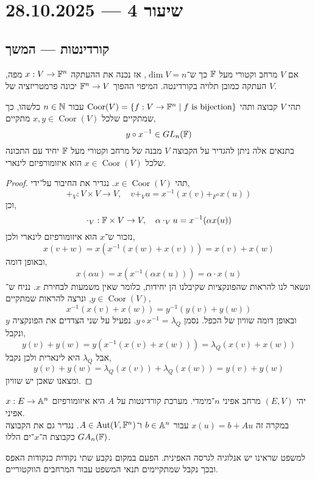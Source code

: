 \section{שיעור 4 --- 28.10.2025}
\subsection{קורדינטות --- המשך}
\begin{definition}
	אם $V$ מרחב וקטורי מעל $\mathbb{F}$ כך ש־$\dim V = n$, אז נכנה את ההעתקה $x : V \to \mathbb{F}^n$ מפה, העתקה כמובן תלויה בקורדינטה.
	המיפוי ההפוך $\mathbb{F}^n \to V$ יכונה פרמטריזציה של $V$.
\end{definition}
\begin{theorem}
	תהי $V$ קבוצה ותהי $\operatorname{Coor}(V) = \{ f : V \to \mathbb{F}^n \mid f \text{ is bijection} \}$ עבור $n \in \mathbb{N}$ כלשהו,
	כך שמתקיים שלכל $x, y \in \operatorname{Coor}(V)$ מתקיים,
	\[
		y \circ x^{-1} \in GL_n(\mathbb{F})
	\]
	בתנאים אלה ניתן להגדיר על הקבוצה $V$ מבנה של מרחב וקטורי מעל $\mathbb{F}$ יחיד עם התכונה שלכל $x \in \operatorname{Coor}(V)$ הוא איזומורפיזם לינארי.
\end{theorem}
\begin{proof}
	תהי $x \in \operatorname{Coor}(V)$.
	נגדיר את החיבור על־ידי,
	\[
		+_V : V \times V \to V,
		\quad
		v +_V u = x^{-1}(x(v) +_{F^n} x(u))
	\]
	וכן,
	\[
		\cdot_V : \mathbb{F} \times V \to V,
		\quad
		\alpha \cdot_V u = x^{-1}(\alpha x(u))
	\]
	נזכור ש־$x$ הוא איזומורפיזם לינארי ולכן,
	\[
		x(v + w)
		= x(x^{-1}(x(w) + x(v)))
		= x(v) + x(w)
	\]
	ובאופן דומה,
	\[
		x(\alpha u)
		= x(x^{-1}(\alpha x(u)))
		= \alpha \cdot x(u)
	\]
	ונשאר לנו להראות שהפונקציות שקיבלנו הן יחידות, כלומר שאין משמעות לבחירת $x$.
	נניח ש־$y \in \operatorname{Coor}(V)$, ונרצה להראות שמתקיים,
	\[
		x^{-1}(x(v) + x(w))
		= y^{-1}(y(v) + y(w))
	\]
	ובאופן דומה שוויון של הכפל.
	נסמן $y \circ x^{-1} = \lambda_Q$.
	נפעיל על שני הצדדים את הפונקציה $y$ ונקבל,
	\[
		y(v) + y(w)
		= y(x^{-1}(x(v) + x(w)))
		= \lambda_Q(x(v) + x(w))
	\]
	אבל $\lambda_Q$ היא לינארית ולכן נקבל,
	\[
		y(v) + y(w)
		= \lambda_Q(x(v)) + \lambda_Q(x(w))
		= y(v) + y(w)
	\]
	ומצאנו שאכן יש שוויון.
\end{proof}
\begin{definition}
	יהי $(E, V)$ מרחב אפיני $n$־מימדי.
	מערכת קורדינטות על $A$ היא איזומורפיזם $x : E \to \mathbb{A}^n$ אפיני. \\
	במקרה זה $x(u) = b + A u$ עבור $b \in \mathbb{A}^n$ ו־$A \in \operatorname{Aut}(V, \mathbb{F}^n)$.
	נגדיר גם את הקבוצה $GA_n(\mathbb{F})$ כקבוצת ה־$x$־ים הללו.
\end{definition}
למשפט שראינו יש אנלוגיה לגרסה האפינית.
הפעם במקום נקבע שתי נקודות כנקודות האפס ובכך נקבל שמתקיימים תנאי המשפט עבור המרחבים הווקטוריים.

\listoftheorems[title=הגדרות ומשפטים,ignoreall,show={theorem,definition},swapnumber,onlynamed={proposition,lemma}]


